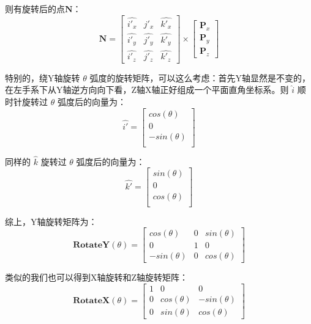 \documentclass[12pt,oneside,a4paper]{ctexart}
\begin{document}
则有旋转后的点$\mathbf{N}$：
\begin{equation*}
	\mathbf{N} = \begin{bmatrix}
		\hat{i'_x} & \hat{j'_x} & \hat{k'_x} \\
		\hat{i'_y} & \hat{j'_y} & \hat{k'_y} \\
		\hat{i'_z} & \hat{j'_z} & \hat{k'_z}
	\end{bmatrix} \times \begin{bmatrix}
		\mathbf{P}_x \\
		\mathbf{P}_y \\
		\mathbf{P}_z
	\end{bmatrix}
\end{equation*}

特别的，绕Y轴旋转 $\theta$ 弧度的旋转矩阵，可以这么考虑：首先Y轴显然是不变的，在左手系下从Y轴逆方向向下看，Z轴X轴正好组成一个平面直角坐标系。则 $\hat{i}$ 顺时针旋转过 $\theta$ 弧度后的向量为：
\begin{equation*}
	\hat{i'}=\begin{bmatrix}
		cos(\theta)  \\
		0            \\
		-sin(\theta) \\
	\end{bmatrix}
\end{equation*}

同样的 $\hat{k}$ 旋转过 $\theta$ 弧度后的向量为：
\begin{equation*}
	\hat{k'}=\begin{bmatrix}
		sin(\theta) \\
		0           \\
		cos(\theta) \\
	\end{bmatrix}
\end{equation*}

综上，Y轴旋转矩阵为：
\begin{equation}
	\mathbf{RotateY}(\theta)=\begin{bmatrix}
		cos(\theta)  & 0 & sin(\theta) \\
		0            & 1 & 0           \\
		-sin(\theta) & 0 & cos(\theta)
	\end{bmatrix}
	\label{RotateY}
\end{equation}

类似的我们也可以得到X轴旋转和Z轴旋转矩阵：
\begin{equation}
	\mathbf{RotateX}(\theta)=\begin{bmatrix}
		1 & 0           & 0            \\
		0 & cos(\theta) & -sin(\theta) \\
		0 & sin(\theta) & cos(\theta)
	\end{bmatrix}
	\label{RotateX}
\end{equation}
\end{document}
